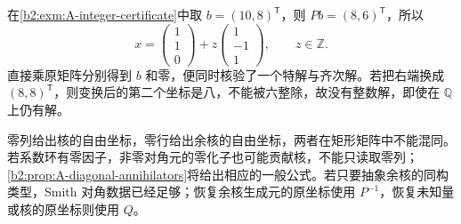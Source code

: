 在\cref{b2:exm:A-integer-certificate}中取 \(b=(10,8)^{\mathsf T}\)，则 \(Pb=(8,6)^{\mathsf T}\)，所以
\[
	x=\begin{pmatrix}1\\1\\0\end{pmatrix}
	+z\begin{pmatrix}1\\-1\\1\end{pmatrix},\qquad z\in\mathbb Z.
\]
直接乘原矩阵分别得到 \(b\) 和零，便同时核验了一个特解与齐次解。若把右端换成 \((8,8)^{\mathsf T}\)，则变换后的第二个坐标是八，不能被六整除，故没有整数解，即使在 \(\mathbb Q\) 上仍有解。

\ProseParagraphBreak
零列给出核的自由坐标，零行给出余核的自由坐标，两者在矩形矩阵中不能混同。若系数环有零因子，非零对角元的零化子也可能贡献核，不能只读取零列；\cref{b2:prop:A-diagonal-annihilators}将给出相应的一般公式。若只要抽象余核的同构类型，Smith 对角数据已经足够；恢复余核生成元的原坐标使用 \(P^{-1}\)，恢复未知量或核的原坐标则使用 \(Q\)。

